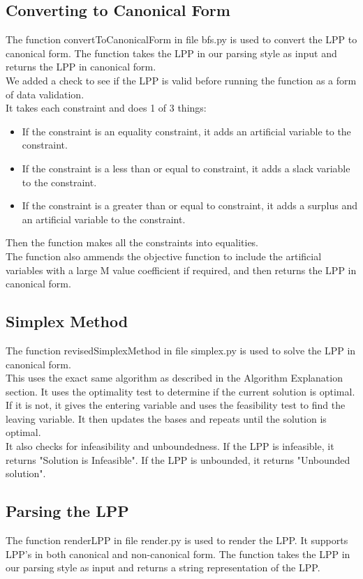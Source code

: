 \documentclass{article}
\numberwithin{equation}{section}
\begin{document}
\subsection{Converting to Canonical Form}
The function convertToCanonicalForm in file bfs.py is used to convert the LPP to canonical form. The function takes the LPP in our parsing style as input and returns the LPP in canonical form.\\
We added a check to see if the LPP is valid before running the function as a form of data validation.\\
It takes each constraint and does 1 of 3 things:
\begin{itemize}
    \item If the constraint is an equality constraint, it adds an artificial variable to the constraint.
    \item If the constraint is a less than or equal to constraint, it adds a slack variable to the constraint.
    \item If the constraint is a greater than or equal to constraint, it adds a surplus and an artificial variable to the constraint.
\end{itemize}
Then the function makes all the constraints into equalities. \\
The function also ammends the objective function to include the artificial variables with a large M value coefficient if required, and then returns the LPP in canonical form.

\subsection{Simplex Method}
The function revisedSimplexMethod in file simplex.py is used to solve the LPP in canonical form.\\ 
This uses the exact same algorithm as described in the Algorithm Explanation section. It uses the optimality test to determine if the current solution is optimal. If it is not, it gives the entering variable and uses the feasibility test to find the leaving variable. It then updates the bases and repeats until the solution is optimal.\\
It also checks for infeasibility and unboundedness. If the LPP is infeasible, it returns "Solution is Infeasible". If the LPP is unbounded, it returns "Unbounded solution".

\subsection{Parsing the LPP}
The function renderLPP in file render.py is used to render the LPP. It supports LPP's in both canonical and non-canonical form. The function takes the LPP in our parsing style as input and returns a string representation of the LPP.
\end{document}
